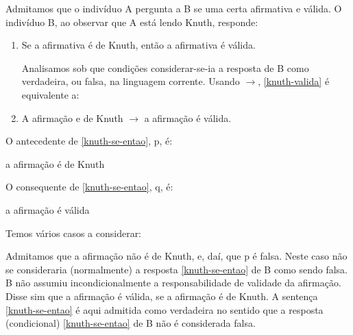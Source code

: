 \begin{enumerate}[label=\textbf{(\arabic*)}]
    \pagebreak

    Admitamos que o indivíduo A pergunta a B se uma certa afirmativa e válida.
    O indivíduo B, ao observar que A está lendo Knuth\footnotemark, responde:

    \begin{enumerate}[label=(\arabic*)]
        \item Se a afirmativa é de Knuth, então a afirmativa é válida. \label{knuth-valida}

        Analisamos sob que condições considerar-se-ia a resposta de B como verdadeira, ou falsa, na linguagem corrente.
        Usando $\to$, \ref{knuth-valida} é equivalente a:

        \item A afirmação e de Knuth $\to$ a afirmação é válida. \label{knuth-se-entao}
    \end{enumerate}

    O antecedente de \ref{knuth-se-entao}, p, é:

    \centerline{a afirmação é de Knuth}

    O consequente de \ref{knuth-se-entao}, q, é:

    \centerline{a afirmação é válida}

    Temos vários casos a considerar:


    Admitamos que a afirmação não é de Knuth, e, daí, que p é falsa.
    Neste caso não se consideraria (normalmente) a resposta \ref{knuth-se-entao} de B como sendo falsa.
    B não assumiu incondicionalmente a responsabilidade de validade da afirmação.
    Disse sim que a afirmação é válida, se a afirmação é de Knuth.
    A sentença \ref{knuth-se-entao} é aqui admitida como verdadeira no sentido que a resposta (condicional) \ref{knuth-se-entao} de B não é considerada falsa.


\end{enumerate}
